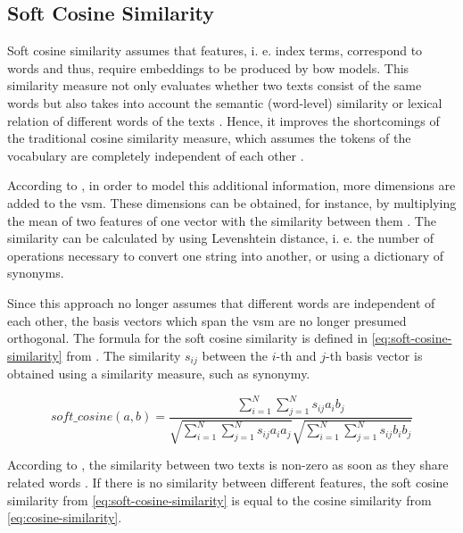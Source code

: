 
\subsection{Soft Cosine Similarity}\label{subsec:soft-cosine-similarity}

Soft cosine similarity assumes that features, i. e. index terms, correspond to words and thus, 
require embeddings to be produced by \ac{bow} models. 
This similarity measure not only evaluates whether two texts consist of the same words but 
also takes into account the semantic (word-level) similarity or lexical relation of different words of the texts \cite{soft_cosine2017}.
Hence, it improves the shortcomings of the traditional cosine similarity measure, 
which assumes the tokens of the vocabulary are completely independent of each other \cite{soft_cosine2014}.

According to \citeauthor{soft_cosine2014}, in order to model this additional information, more dimensions are added to the \ac{vsm}.
These dimensions can be obtained, for instance, by multiplying the mean of two features of one vector with the similarity between them \cite{soft_cosine2014}.
The similarity can be calculated by using Levenshtein distance, i. e. the number of operations necessary to convert one string into another, 
or using a dictionary of synonyms.

Since this approach no longer assumes that different words are independent of each other, 
the basis vectors which span the \ac{vsm} are no longer presumed orthogonal.
The formula for the soft cosine similarity is defined in \autoref{eq:soft-cosine-similarity} from \cite{soft_cosine2014}.
The similarity $s_{ij}$ between the $i$-th and $j$-th basis vector is obtained using a similarity measure, such as synonymy.

\begin{equation}
    soft\_cosine(a,b) = \frac{\sum_{i=1}^{N}\sum_{j=1}^{N}s_{ij}a_{i}b_{j}}{\sqrt{\sum_{i=1}^{N}\sum_{j=1}^{N}s_{ij}a_{i}a_{j}}\sqrt{\sum_{i=1}^{N}\sum_{j=1}^{N}s_{ij}b_{i}b_{j}}}
    \label{eq:soft-cosine-similarity}
\end{equation}

According to \citeauthor{soft_cosine2017}, the similarity between two texts is non-zero as soon as they share related words \cite{soft_cosine2017}.
If there is no similarity between different features, 
the soft cosine similarity from \autoref{eq:soft-cosine-similarity} is equal to the cosine similarity from \autoref{eq:cosine-similarity}.
